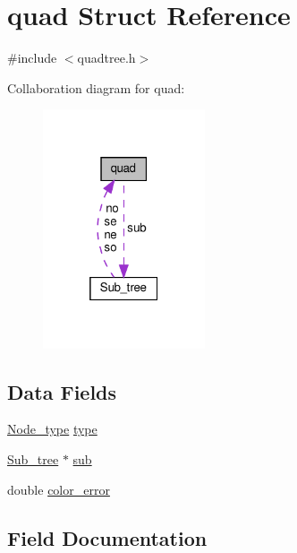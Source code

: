 \hypertarget{structquad}{}\section{quad Struct Reference}
\label{structquad}


{\ttfamily \#include $<$quadtree.\+h$>$}



Collaboration diagram for quad\+:\nopagebreak
\begin{figure}[H]
\begin{center}
\leavevmode
\includegraphics[width=136pt]{structquad__coll__graph}
\end{center}
\end{figure}
\subsection*{Data Fields}
\begin{DoxyCompactItemize}
\item 
\hyperlink{quadtree_8h_a4bafb4a83e1da39fd7547ca43cff608d}{Node\+\_\+type} \hyperlink{structquad_a4c74e17073371714f09bfd5777ce1cc9}{type}
\item 
\hyperlink{unionSub__tree}{Sub\+\_\+tree} $\ast$ \hyperlink{structquad_ac804ea0472312bf6c9191cf863e07ad3}{sub}
\item 
double \hyperlink{structquad_a0431b95089e823b3615f557fe0d9e1eb}{color\+\_\+error}
\end{DoxyCompactItemize}


\subsection{Field Documentation}
\mbox{\label{structquad_a0431b95089e823b3615f557fe0d9e1eb}} 
